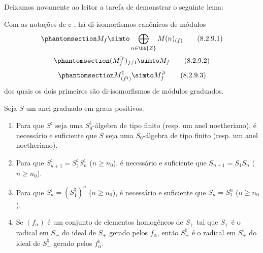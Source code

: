 \documentclass[oneside,10pt]{amsart}
\renewcommand{\geq}{\geqslant}
\let\EGAOriginalLabel\label
\renewcommand{\label}[1]{\phantomsection\EGAOriginalLabel{#1}}
\begin{document}
Deixamos novamente ao leitor a tarefa de demonstrar o seguinte lema:
\begin{lemma}[8.2.9]
\label{II.8.2.9}
Com as notações de  e , há di-isomorfismos canônicos de módulos
\[
\label{II.8.2.9.1}
  M_f \simto \bigoplus_{n\in\bb{Z}} M(n)_{(f)}
\tag{8.2.9.1}
\]
\[
\label{II.8.2.9.2}
  (M_f^\geq)_{f/1} \simto M_f
\tag{8.2.9.2}
\]
\[
\label{II.8.2.9.3}
  M_{(f^\natural)}^\natural \simto M_f^\geq
\tag{8.2.9.3}
\]
dos quais os dois primeiros são di-isomorfismos de módulos graduados.
\end{lemma}

\begin{lemma}[8.2.10]
\label{II.8.2.10}
Seja $S$ um anel graduado em graus positivos.
\begin{enumerate}
  \item[\rm{(i)}] Para que $S^\natural$ seja uma $S_0^\natural$-álgebra de tipo finito (resp. um anel noetheriano), é necessário e suficiente que $S$ seja uma $S_0$-álgebra de tipo finito (resp. um anel noetheriano).
  \item[\rm{(ii)}] Para que $S_{n+1}^\natural = S_1^\natural S_n^\natural$ ($n\geq n_0$), é necessário e suficiente que $S_{n+1}=S_1S_n$ ($n\geq n_0$).
  \item[\rm{(iii)}] Para que $S_n^\natural = (S_1^\natural)^n$ ($n\geq n_0$), é necessário e suficiente que $S_n=S_1^n$ ($n\geq n_0$).
  \item[\rm{(iv)}] Se $(f_\alpha)$ é um conjunto de elementos homogêneos de $S_+$ tal que $S_+$ é o radical em $S_+$ do ideal de $S_+$ gerado pelos $f_\alpha$, então $S_+^\natural$ é o radical em $S_+^\natural$ do ideal de $S_+^\natural$ gerado pelos $f_\alpha^\natural$.
\end{enumerate}
\end{lemma}
\end{document}
